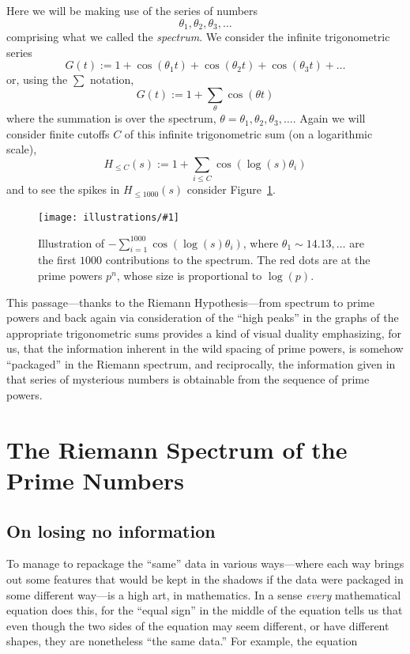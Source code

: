 \documentclass[openany]{book}
\newcommand{\ill}[3]{%
   \begin{figure}[H]%
   \vspace{-2ex}
   \centering%
   \texttt{[image: illustrations/\#1]}%
   \caption{#3}%
   \vspace{-2ex}
    \end{figure}}
\theoremstyle{plain}
\theoremstyle{definition}
\begin{document}
{\begin{enumerate}
  Here we will be making use of the series of numbers $$\theta_1,
  \theta_2, \theta_3, \dots$$ comprising what we called the {\it
    spectrum}. We consider the infinite trigonometric series
  $$
  G(t):= 1 + \cos(\theta_1t)+\cos(\theta_2t)+\cos(\theta_3t)+\dots
  $$
  or, using the $\sum$ notation,
 $$
 G(t):=  1+\sum_{\theta}\cos(\theta t)
 $$
 where the summation is over the spectrum, $\theta=\theta_1, \theta_2,
 \theta_3, \dots$. Again we will consider finite cutoffs $C$ of this
 infinite trigonometric sum (on a logarithmic scale),
 $$
 H_{\le C}(s):= 1+\sum_{i \leq C}\cos(\log(s) \theta_i)
 $$
 and to see the spikes in $H_{\le 1000}(s)$
 consider Figure~\ref{fig:phihat}.

 \ill{phi_cos_sum_2_30_1000}{.8}{Illustration of $-\sum_{i=1}^{1000}
   \cos(\log(s)\theta_i)$, where $\theta_1 \sim 14.13, \ldots$ are the
   first $1000$ contributions to the spectrum\index{spectrum}.  The red dots
   are at the prime powers $p^n$, whose size is proportional to
   $\log(p)$.\label{fig:phihat}}

\end{enumerate}

This passage---thanks to the Riemann Hypothesis---from spectrum to
prime powers and back again via consideration of the ``high peaks'' in
the graphs of the appropriate trigonometric sums provides a kind of
visual duality emphasizing, for us, that the information inherent in
the wild spacing of prime powers, is somehow ``packaged'' in the Riemann spectrum, and reciprocally,
the information given in that series of mysterious numbers is
obtainable from the sequence of prime powers.



\part{The Riemann Spectrum of the Prime Numbers\label{part3}}


\chapter{On losing no information\label{sec:loseno}}

To manage to repackage the ``same'' data in various ways---where each
way brings out some features that would be kept in the shadows if the
data were packaged in some different way---is a high art, in
mathematics. In a sense {\it every} mathematical equation does this,
for the ``equal sign'' in the middle of the equation tells us that
even though the two sides of the equation may seem different, or have
different shapes, they are nonetheless ``the same data.''  For
example, the equation

}
\end{document}
